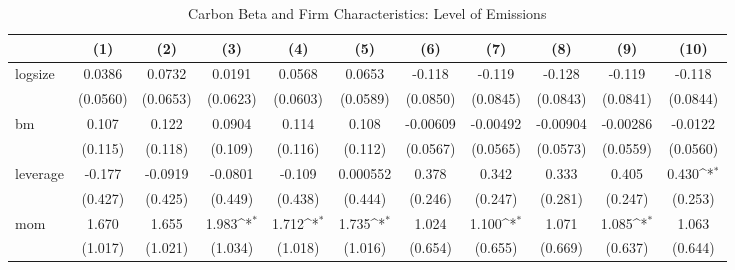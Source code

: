 \begin{table}[htbp]\centering
\def\sym#1{\ifmmode^{#1}\else\(^{#1}\)\fi}
\caption{Carbon Beta and Firm Characteristics: Level of Emissions}
\begin{tabular}{l*{10}{c}}
\hline\hline
                &\multicolumn{1}{c}{(1)}         &\multicolumn{1}{c}{(2)}         &\multicolumn{1}{c}{(3)}         &\multicolumn{1}{c}{(4)}         &\multicolumn{1}{c}{(5)}         &\multicolumn{1}{c}{(6)}         &\multicolumn{1}{c}{(7)}         &\multicolumn{1}{c}{(8)}         &\multicolumn{1}{c}{(9)}         &\multicolumn{1}{c}{(10)}         \\
\hline
logsize         &   0.0386         &   0.0732         &   0.0191         &   0.0568         &   0.0653         &   -0.118         &   -0.119         &   -0.128         &   -0.119         &   -0.118         \\
                & (0.0560)         & (0.0653)         & (0.0623)         & (0.0603)         & (0.0589)         & (0.0850)         & (0.0845)         & (0.0843)         & (0.0841)         & (0.0844)         \\
bm              &    0.107         &    0.122         &   0.0904         &    0.114         &    0.108         & -0.00609         & -0.00492         & -0.00904         & -0.00286         &  -0.0122         \\
                &  (0.115)         &  (0.118)         &  (0.109)         &  (0.116)         &  (0.112)         & (0.0567)         & (0.0565)         & (0.0573)         & (0.0559)         & (0.0560)         \\
leverage        &   -0.177         &  -0.0919         &  -0.0801         &   -0.109         & 0.000552         &    0.378         &    0.342         &    0.333         &    0.405         &    0.430\sym{*}  \\
                &  (0.427)         &  (0.425)         &  (0.449)         &  (0.438)         &  (0.444)         &  (0.246)         &  (0.247)         &  (0.281)         &  (0.247)         &  (0.253)         \\
mom             &    1.670         &    1.655         &    1.983\sym{*}  &    1.712\sym{*}  &    1.735\sym{*}  &    1.024         &    1.100\sym{*}  &    1.071         &    1.085\sym{*}  &    1.063         \\
                &  (1.017)         &  (1.021)         &  (1.034)         &  (1.018)         &  (1.016)         &  (0.654)         &  (0.655)         &  (0.669)         &  (0.637)         &  (0.644)         \\

\end{tabular}
\end{table}
